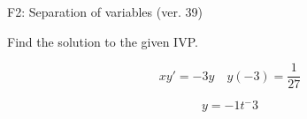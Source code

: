 \begin{exercise}
  \begin{exerciseTitle}F2: Separation of variables (ver. 39)\end{exerciseTitle}
  \begin{exerciseStatement}
    
Find the solution to the given IVP.

    
\[xy'= -3 y \hspace{1em} y( -3 ) = \frac{1}{27}\]

  \end{exerciseStatement}
  \begin{exerciseAnswer}
    
\[y= -1 t^ -3\]

  \end{exerciseAnswer}
\end{exercise}